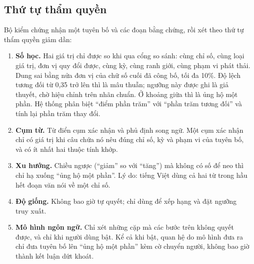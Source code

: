 \subsection{Thứ tự thẩm quyền}

Bộ kiểm chứng nhận một tuyên bố và các đoạn bằng chứng, rồi xét theo thứ tự thẩm quyền giảm dần:
\begin{enumerate}
\item \textbf{Số học.} Hai giá trị chỉ được so khi qua cổng so sánh: cùng chỉ số, cùng loại giá trị, đơn vị quy đổi được, cùng kỳ, cùng ranh giới, cùng phạm vi phát thải. Dung sai bằng nửa đơn vị của chữ số cuối đã công bố, tối đa 10\%. Độ lệch tương đối từ 0,35 trở lên thì là mâu thuẫn; ngưỡng này được ghi là giả thuyết, chờ hiệu chỉnh trên nhãn chuẩn. Ở khoảng giữa thì là ủng hộ một phần. Hệ thống phân biệt “điểm phần trăm” với “phần trăm tương đối” và tính lại phần trăm thay đổi.
\item \textbf{Cụm từ.} Từ điển cụm xác nhận và phủ định song ngữ. Một cụm xác nhận chỉ có giá trị khi câu chứa nó nêu đúng chỉ số, kỳ và phạm vi của tuyên bố, và có ít nhất hai thuộc tính khớp.
\item \textbf{Xu hướng.} Chiều ngược (“giảm” so với “tăng”) mà không có số để neo thì chỉ hạ xuống “ủng hộ một phần”. Lý do: tiếng Việt dùng cả hai từ trong hầu hết đoạn văn nói về một chỉ số.
\item \textbf{Độ giống.} Không bao giờ tự quyết; chỉ dùng để xếp hạng và đặt ngưỡng truy xuất.
\item \textbf{Mô hình ngôn ngữ.} Chỉ xét những cặp mà các bước trên không quyết được, và chỉ khi người dùng bật. Kể cả khi bật, quan hệ do mô hình đưa ra chỉ đưa tuyên bố lên “ủng hộ một phần” kèm cờ chuyển người, không bao giờ thành kết luận dứt khoát.
\end{enumerate}

